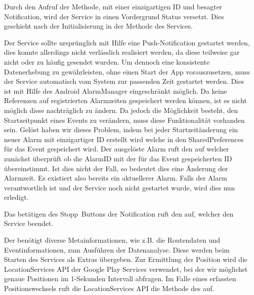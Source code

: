 Durch den Aufruf der  Methode, mit einer einzigartigen ID und besagter Notification, wird der Service in einen Vordergrund Status versetzt. Dies geschieht nach der Initialisierung in der  Methode des Services.

Der Service sollte ursprünglich mit Hilfe eine Push-Notification gestartet werden, dies konnte allerdings nicht verlässlich realisiert werden, da diese teilweise gar nicht oder zu häufig gesendet wurden. Um dennoch eine konsistente Datenerhebung zu gewährleisten, ohne einen Start der App vorauszusetzen, muss der Service automatisch vom System zur passenden Zeit gestartet werden. Dies ist mit Hilfe des Android AlarmManager eingeschränkt möglich. Da keine Referenzen auf registrierten Alarmzeiten gespeichert werden können, ist es nicht möglich diese nachträglich zu ändern. Da jedoch die Möglichkeit besteht, den Startzeitpunkt eines Events zu verändern, muss diese Funktionalität vorhanden sein. Gelöst haben wir dieses Problem, indem bei jeder Startzeitänderung ein neuer Alarm mit einzigartiger ID erstellt wird welche in den SharedPreferences für das Event gespeichert wird. Der ausgelöste Alarm ruft den  auf welcher zunächst überprüft ob die AlarmID mit der für das Event gespeicherten ID übereinstimmt. Ist dies nicht der Fall, so bedeutet dies eine Änderung der Alarmzeit. Es existiert also bereits ein aktuellerer Alarm. Falls der Alarm verantwortlich ist und der Service noch nicht gestartet wurde, wird dies nun erledigt.

Das betätigen des \glqq Stopp\grqq\ Buttons der Notification ruft den  auf, welcher den Service beendet.

Der  benötigt diverse Metainformationen, wie z.B. die Routendaten und Eventinformationen, zum Ausführen der Datenanalyse. Diese werden beim Starten des Services als Extras übergeben. Zur Ermittlung der Position wird die LocationServices API der Google Play Services verwendet, bei der wir möglichst genaue Positionen im 1-Sekunden Intervall abfragen. Im Falle eines erfassten Positionswechsels ruft die LocationServices API die  Methode des  auf.

